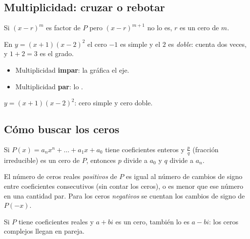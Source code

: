 \documentclass[11pt,a4paper]{article}
\begin{document}
\subsection{Multiplicidad: cruzar o rebotar}
\begin{minipage}[c]{0.5\linewidth}
\begin{definicion}[Multiplicidad]
Si $(x-r)^m$ es factor de $P$ pero $(x-r)^{m+1}$ no lo es, $r$ es un cero de  $m$.
\end{definicion}
En $y=(x+1)(x-2)^2$ el cero $-1$ es simple y el $2$ es \emph{doble}: cuenta dos veces, y $1+2=3$ es el grado.
\begin{itemize}
\item Multiplicidad \textbf{impar}: la gráfica  el eje.
\item Multiplicidad \textbf{par}: lo .
\end{itemize}
\end{minipage}\hfill
\begin{minipage}[c]{0.46\linewidth}\centering
{}

{\small\color{zmute}$y=(x+1)(x-2)^2$: cero simple y cero doble.}
\end{minipage}

\subsection{Cómo buscar los ceros}
\begin{propiedad}
Si $P(x)=a_nx^n+\dots+a_1x+a_0$ tiene coeficientes enteros y $\tfrac{p}{q}$ (fracción irreducible) es un cero de
$P$, entonces $p$ divide a $a_0$ y $q$ divide a $a_n$.
\end{propiedad}
\begin{propiedad}
El número de ceros reales \emph{positivos} de $P$ es igual al número de cambios de signo entre coeficientes
consecutivos (sin contar los ceros), o es menor que ese número en una cantidad par. Para los ceros
\emph{negativos} se cuentan los cambios de signo de $P(-x)$.
\end{propiedad}
\begin{propiedad}
Si $P$ tiene coeficientes reales y $a+bi$ es un cero, también lo es $a-bi$: los ceros complejos llegan en pareja.
\end{propiedad}
\end{document}
